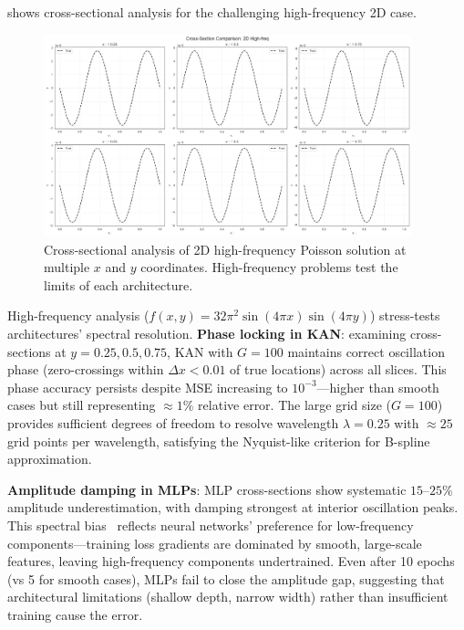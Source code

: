 \documentclass[11pt,a4paper]{article}
\begin{document}
 shows cross-sectional analysis for the challenging high-frequency 2D case.

\begin{figure}[htbp]
\centering
\includegraphics[width=0.95\textwidth]{../section1/analysis/section1_complete_analysis_20251021_143055/section1_3_analysis/03_heatmap_analysis/cross_section_2_2D High-freq.png}
\caption{Cross-sectional analysis of 2D high-frequency Poisson solution at multiple $x$ and $y$ coordinates. High-frequency problems test the limits of each architecture.}
\label{fig:s13_cross_highfreq}
\end{figure}

High-frequency analysis ($f(x,y) = 32\pi^2\sin(4\pi x)\sin(4\pi y)$) stress-tests architectures' spectral resolution. \textbf{Phase locking in KAN}: examining cross-sections at $y=0.25, 0.5, 0.75$, KAN with $G=100$ maintains correct oscillation phase (zero-crossings within $\Delta x < 0.01$ of true locations) across all slices. This phase accuracy persists despite MSE increasing to $10^{-3}$—higher than smooth cases but still representing $\approx 1\%$ relative error. The large grid size ($G=100$) provides sufficient degrees of freedom to resolve wavelength $\lambda = 0.25$ with $\approx 25$ grid points per wavelength, satisfying the Nyquist-like criterion for B-spline approximation.

\textbf{Amplitude damping in MLPs}: MLP cross-sections show systematic $15$--$25\%$ amplitude underestimation, with damping strongest at interior oscillation peaks. This spectral bias~\citep{krishnapriyan2021characterizing} reflects neural networks' preference for low-frequency components—training loss gradients are dominated by smooth, large-scale features, leaving high-frequency components undertrained. Even after 10 epochs (vs 5 for smooth cases), MLPs fail to close the amplitude gap, suggesting that architectural limitations (shallow depth, narrow width) rather than insufficient training cause the error.
\end{document}
